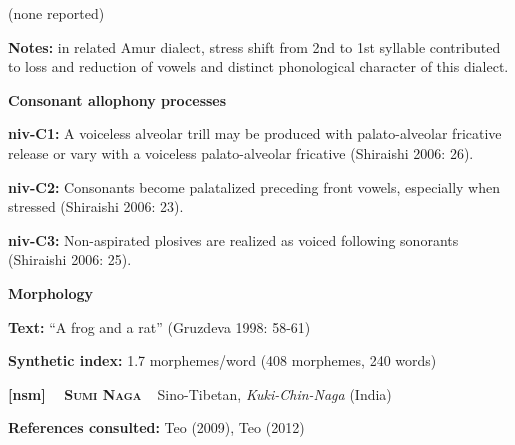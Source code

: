 \begin{styleBody}
(none reported)
\end{styleBody}

\begin{styleBody}
\textbf{Notes:} in related Amur dialect, stress shift from 2nd to 1st syllable contributed to loss and reduction of vowels and distinct phonological character of this dialect.
\end{styleBody}

\begin{styleBody}
\textbf{Consonant allophony processes}
\end{styleBody}

\begin{styleBody}
\textbf{niv-C1: }A voiceless alveolar trill may be produced with palato-alveolar fricative release or vary with a voiceless palato-alveolar fricative (Shiraishi 2006: 26).
\end{styleBody}

\begin{styleBody}
\textbf{niv-C2: }Consonants become palatalized preceding front vowels, especially when stressed (Shiraishi 2006: 23).
\end{styleBody}

\begin{styleBody}
\textbf{niv-C3: }Non-aspirated plosives are realized as voiced following sonorants (Shiraishi 2006: 25).
\end{styleBody}

\begin{styleBody}
\textbf{Morphology}
\end{styleBody}

\begin{styleBody}
\textbf{Text:} “A frog and a rat” (Gruzdeva 1998: 58-61)
\end{styleBody}

\begin{styleBody}
\textbf{Synthetic index: }1.7 morphemes/word (408 morphemes, 240 words)
\end{styleBody}

\clearpage\begin{styleBody}
\textbf{[nsm] }\ \ \textbf{\textsc{Sumi Naga}}\textbf{\ \ }Sino-Tibetan, \textit{Kuki-Chin-Naga} (India)
\end{styleBody}

\begin{styleBody}
\textbf{References consulted: }Teo (2009), Teo (2012)
\end{styleBody}

